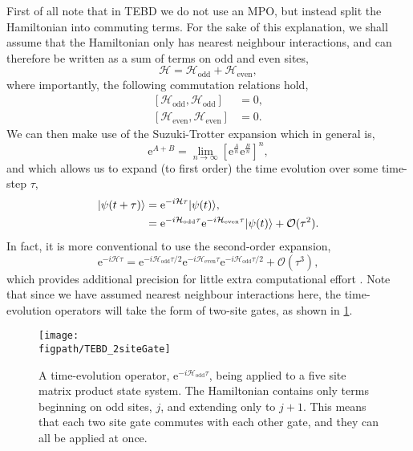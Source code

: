 First of all note that in TEBD we do not use an MPO, but instead split the Hamiltonian into commuting terms. For the sake of this explanation, we shall assume that the Hamiltonian only has nearest neighbour interactions, and can therefore be written as a sum of terms on odd and even sites,
\begin{equation}
	\mathcal{H} = \mathcal{H}_{\mathrm{odd}} + \mathcal{H}_{\mathrm{even}},
	\label{eq:te1}
\end{equation}
where importantly, the following commutation relations hold,
\begin{align}
	\left[\mathcal{H}_{\mathrm{odd}}, \mathcal{H}_{\mathrm{odd}}\right] &= 0, \label{eq:te2} \\
	\left[\mathcal{H}_{\mathrm{even}}, \mathcal{H}_{\mathrm{even}}\right] &= 0. \label{eq:te3}
\end{align}
We can then make use of the Suzuki-Trotter expansion \cite{Suzuki1976} which in general is,
\begin{equation}
	\mathrm{e}^{A+B} = \lim_{n \rightarrow \infty}\left[ \mathrm{e}^{\frac{A}{n}} \mathrm{e}^{\frac{B}{n}}\right]^{n},
	\label{eq:te4}
\end{equation}
and which allows us to expand (to first order) the time evolution over some time-step \(\tau\),
\begin{align}
	|\psi(t+\tau)\rangle &= \mathrm{e}^{-i\mathcal{H}\tau}|\psi(t) \rangle, \notag \\
	&= \mathrm{e}^{-i\mathcal{H}_{\mathrm{odd}}\tau}\mathrm{e}^{-i\mathcal{H}_{\mathrm{even}}\tau}|\psi(t) \rangle + \mathcal{O}(\tau^{2}).
	\label{eq:te5}
\end{align}
In fact, it is more conventional to use the second-order expansion,
\begin{equation}
	\mathrm{e}^{-i\mathcal{H}\tau} = \mathrm{e}^{-i\mathcal{H}_{\mathrm{odd}}\tau / 2}\mathrm{e}^{-i\mathcal{H}_{\mathrm{even}}\tau}\mathrm{e}^{-i\mathcal{H}_{\mathrm{odd}}\tau / 2} + \mathcal{O}(\tau^{3}),
	\label{eq:te6}
\end{equation}
which provides additional precision for little extra computational effort \cite{Schollwock2011}. Note that since we have assumed nearest neighbour interactions here, the time-evolution operators will take the form of two-site gates, as shown in \cref{fig:te1}.
\begin{figure}[ht]
	\centering
	\texttt{[image: \\figpath/TEBD\_2siteGate]}
	\caption{\label{fig:te1} A time-evolution operator, \(\mathrm{e}^{-i\mathcal{H}_{\mathrm{odd}}\tau}\), being applied to a five site matrix product state system. The Hamiltonian contains only terms beginning on odd sites, \(j\), and extending only to \(j+1\). This means that each two site gate commutes with each other gate, and they can all be applied at once.}
\end{figure}%
